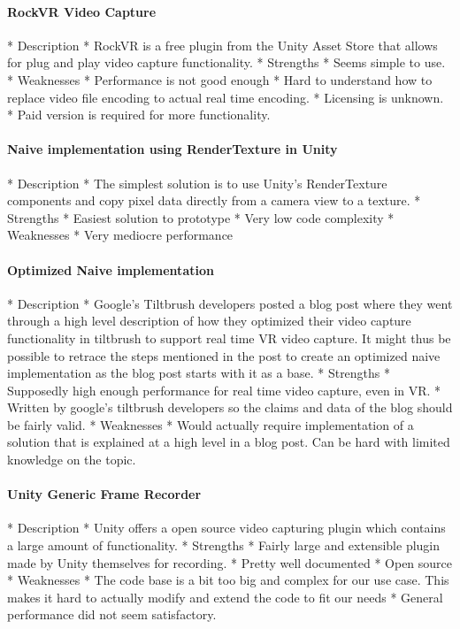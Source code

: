 \paragraph{RockVR Video Capture}
        * Description
            * RockVR is a free plugin from the Unity Asset Store that allows for plug and play video capture functionality. 
        * Strengths
            * Seems simple to use. 
        * Weaknesses
            * Performance is not good enough
            * Hard to understand how to replace video file encoding to actual real time encoding.
            * Licensing is unknown. 
            * Paid version is required for more functionality. 
\paragraph{Naive implementation using RenderTexture in Unity}
        * Description
            * The simplest solution is to use Unity's RenderTexture components and copy pixel data directly from a camera view to a texture. 
        * Strengths
            * Easiest solution to prototype
            * Very low code complexity
        * Weaknesses
            * Very mediocre performance
\paragraph{Optimized Naive implementation}
        * Description
            * Google's Tiltbrush developers posted a blog post where they went through a high level description of how they optimized their video capture functionality in tiltbrush to support real time VR video capture. It might thus be possible to retrace the steps mentioned in the post to create an optimized naive implementation as the blog post starts with it as a base. 
        * Strengths
            * Supposedly high enough performance for real time video capture, even in VR.
            * Written by google's tiltbrush developers so the claims and data of the blog should be fairly valid. 
        * Weaknesses
            * Would actually require implementation of a solution that is explained at a high level in a blog post. Can be hard with limited knowledge on the topic. 
\paragraph{Unity Generic Frame Recorder}
        * Description
            * Unity offers a open source video capturing plugin which contains a large amount of functionality. 
        * Strengths
            * Fairly large and extensible plugin made by Unity themselves for recording. 
            * Pretty well documented
            * Open source
        * Weaknesses
            * The code base is a bit too big and complex for our use case. This makes it hard to actually modify and extend the code to fit our needs 
            * General performance did not seem satisfactory. 
